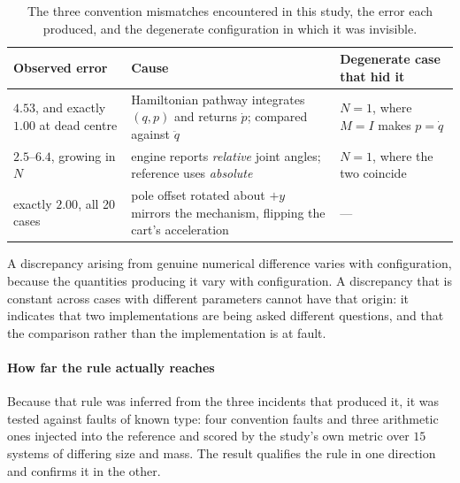 \documentclass[review,12pt]{elsarticle}
\begin{document}
\begin{table}[!htbp]
\centering
\caption{The three convention mismatches encountered in this study, the
error each produced, and the degenerate configuration in which it was
invisible.}
\label{tab:conventions}
\footnotesize
\setlength{\tabcolsep}{4pt}
\begin{tabular}{@{}L{0.26\textwidth}L{0.36\textwidth}L{0.26\textwidth}@{}}
\toprule
\textbf{Observed error} & \textbf{Cause} & \textbf{Degenerate case that hid it} \\
\midrule
$4.53$, and exactly $1.00$ at dead centre & Hamiltonian pathway integrates $(q,p)$ and returns $\dot p$; compared against $\ddot q$ & $N{=}1$, where $M = I$ makes $p = \dot q$ \\
$2.5$--$6.4$, growing in $N$ & engine reports \emph{relative} joint angles; reference uses \emph{absolute} & $N{=}1$, where the two coincide \\
exactly $2.00$, all 20 cases & pole offset rotated about $+y$ mirrors the mechanism, flipping the cart's acceleration & --- \\
\bottomrule
\end{tabular}
\end{table}

A discrepancy arising from genuine numerical difference varies with
configuration, because the quantities producing it vary with configuration. A
discrepancy that is constant across cases with different parameters cannot have
that origin: it indicates that two implementations are being asked different
questions, and that the comparison rather than the implementation is at fault.

\paragraph{How far the rule actually reaches}
Because that rule was inferred from the three incidents that produced it, it was
tested against faults of known type: four convention faults and three arithmetic
ones injected into the reference and scored by the study's own metric over $15$
systems of differing size and mass. The result qualifies the rule in one
direction and confirms it in the other.
\end{document}
